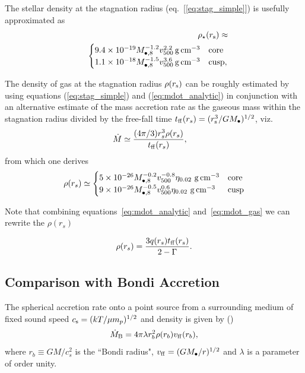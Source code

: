 \documentclass[usenatbib,fleqn]{mn2e}
\newcommand{\rs}{r_s}
\newcommand{\Mbheight}{M_{\bullet,8}}
\newcommand{\tff}{t_{\rm ff}}
\begin{document}
The stellar density at the stagnation radius (eq.~[\ref{eq:stag_simple}]) is usefully approximated as
\begin{eqnarray}
  && \rho_{\star}(r_{\rm s}) \approx \nonumber \\
  && \begin{cases}
    9.4 \times 10^{-19}M_{\bullet,8}^{-1.2}v_{500}^{2.2}\,{\rm g\,cm^{-3}}
    & \text{core} \\
    1.1 \times 10^{-18} M_{\bullet,8}^{-1.5}v_{500}^{3.6}
    \,{\rm g\,cm^{-3}}  & \text{cusp}, 
  \end{cases}
  \label{eq:rhostarrs}
\end{eqnarray}

The density of gas at the stagnation radius $\rho(r_{\rm s})$ can be roughly estimated by using equations (\ref{eq:stag_simple}) and (\ref{eq:mdot_analytic}) in conjunction with an alternative estimate of the mass accretion rate as the gaseous mass within the stagnation radius divided by the free-fall time $t_{\rm ff}(\rs) = (r_{\rm s}^{3}/GM_{\bullet})^{1/2}$, viz.
\begin{align}
  &\dot{M}\simeq\frac{(4 \pi/3) \rs^3 \rho(\rs)}{\tff(\rs)},
  \label{eq:mdot_gas}
\end{align}
from which one derives 
\begin{align}
  \rho(\rs)\simeq
  \begin{cases}
    5 \times 10^{-26} \Mbheight^{-0.2} v_{500}^{-0.8}  \eta_{0.02} \,
    \, {\rm g \, cm^{-3}}& \text{core}\\
    9 \times 10^{-26}  \Mbheight^{-0.5} v_{500}^{0.6}  \eta_{0.02} \,\, {\rm g \,cm^{-3}} & \text{cusp}
  \end{cases}
  \label{eq:rhors}
\end{align}

Note that combining equations~\eqref{eq:mdot_analytic}
and~\eqref{eq:mdot_gas} we can rewrite the $\rho(\rs)$ 

\begin{align}
\rho(\rs)=\frac{3 q(\rs) \tff(\rs)}{2-\Gamma}.
\label{eq:rhors2}
\end{align}

\subsection{Comparison with Bondi Accretion}
The spherical accretion rate onto a point source from a surrounding
medium of fixed sound speed $c_{\rm s} = (kT/\mu m_p)^{1/2}$ and
density is given by (\citealt{Bondi52})
\begin{align}
  \dot{M}_{\rm B} =4\pi \lambda r_b^2 \rho(r_b) v_{\rm ff}(r_b),
\label{eq:bondi}
\end{align}
where $r_b \equiv GM/c_{s}^{2}$ is the ``Bondi radius", $v_{\rm ff} = (GM_{\bullet}/r)^{1/2}$ and $\lambda$ is a parameter of order unity.  
\end{document}
